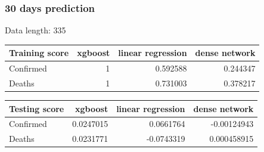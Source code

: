 \documentclass[a4paper,12pt]{article}
\begin{document}
\subsubsection{30 days prediction}
\begin{tcolorbox}
    Data length:	 335

    \begin{tabular}{lrrr}
    \toprule
     Training score   &   xgboost &   linear regression &   dense network \\
    \midrule
     Confirmed        &         1 &            0.592588 &        0.244347 \\
     Deaths           &         1 &            0.731003 &        0.378217 \\
    \bottomrule
    \end{tabular}
    
    
    \begin{tabular}{lrrr}
    \toprule
     Testing score   &   xgboost &   linear regression &   dense network \\
    \midrule
     Confirmed       & 0.0247015 &           0.0661764 &    -0.00124943  \\
     Deaths          & 0.0231771 &          -0.0743319 &     0.000458915 \\
    \bottomrule
    \end{tabular}
    

\end{tcolorbox}
\end{document}
